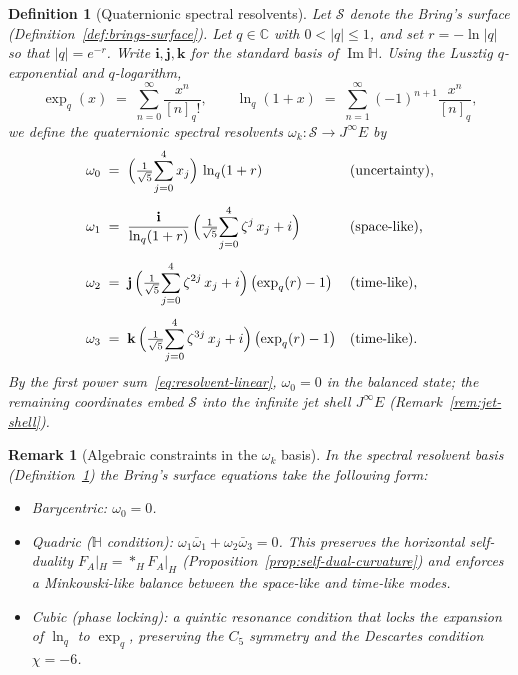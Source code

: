 \documentclass[12pt,a4paper]{report}
\newtheorem{definition}[theorem]{Definition}
\newtheorem{remark}[theorem]{Remark}
\begin{document}
\begin{definition}[Quaternionic spectral resolvents]
\label{def:quaternionic-spectral-resolvents}
Let $\mathcal{S}$ denote the Bring's surface
(Definition~\ref{def:brings-surface}).  Let $q\in\mathbb{C}$ with
$0<\lvert q\rvert\le 1$, and set $r=-\ln\lvert q\rvert$ so that
$\lvert q\rvert=e^{-r}$.
Write $\mathbf{i},\mathbf{j},\mathbf{k}$ for the standard basis of
$\operatorname{Im}\mathbb{H}$.
Using the Lusztig $q$-exponential and $q$-logarithm,
\begin{equation}\label{eq:q-exp}
  \exp_q(x)\;=\;\sum_{n=0}^{\infty}\frac{x^n}{[n]_q!},
  \qquad
  \ln_q(1+x)\;=\;\sum_{n=1}^{\infty}(-1)^{n+1}\frac{x^n}{[n]_q},
\end{equation}
we define the \emph{quaternionic spectral resolvents}
$\omega_k\colon\mathcal{S}\to J^\infty E$ by
\begin{align}
  \omega_0 &\;=\;
    \Bigl(\tfrac{1}{\sqrt{5}}\!\sum_{j=0}^{4}x_j\Bigr)\,
    \ln_q(1+r)
    &&\text{(uncertainty),}
    \label{eq:omega-0}\\[4pt]
  \omega_1 &\;=\;
    \frac{\mathbf{i}}{\ln_q(1+r)}\,
    \Bigl(\tfrac{1}{\sqrt{5}}\!\sum_{j=0}^{4}\zeta^{j}\,x_j+i\Bigr)
    &&\text{(space-like),}
    \label{eq:omega-1}\\[4pt]
  \omega_2 &\;=\;
    \mathbf{j}\,
    \Bigl(\tfrac{1}{\sqrt{5}}\!\sum_{j=0}^{4}\zeta^{2j}\,x_j+i\Bigr)\,
    \bigl(\exp_q(r)-1\bigr)
    &&\text{(time-like),}
    \label{eq:omega-2}\\[4pt]
  \omega_3 &\;=\;
    \mathbf{k}\,
    \Bigl(\tfrac{1}{\sqrt{5}}\!\sum_{j=0}^{4}\zeta^{3j}\,x_j+i\Bigr)\,
    \bigl(\exp_q(r)-1\bigr)
    &&\text{(time-like).}
    \label{eq:omega-3}
\end{align}
By the first power sum~\eqref{eq:resolvent-linear}, $\omega_0=0$ in the
balanced state; the remaining coordinates embed $\mathcal{S}$ into the
infinite jet shell $J^\infty E$
(Remark~\ref{rem:jet-shell}).
\end{definition}

\begin{remark}[Algebraic constraints in the $\omega_k$ basis]
\label{rem:omega-constraints}
In the spectral resolvent basis
(Definition~\ref{def:quaternionic-spectral-resolvents}) the
Bring's surface equations take the following form:
\begin{itemize}
\item \emph{Barycentric:}\; $\omega_0=0$.
\item \emph{Quadric ($\mathbb{H}$ condition):}\;
  $\omega_1\bar{\omega}_1+\omega_2\bar{\omega}_3=0$.
  This preserves the horizontal self-duality $F_A|_H={*_H}F_A|_H$
  (Proposition~\ref{prop:self-dual-curvature}) and enforces a
  Minkowski-like balance between the space-like and time-like modes.
\item \emph{Cubic (phase locking):}\; a quintic resonance condition that
  locks the expansion of $\ln_q$ to $\exp_q$, preserving the $C_5$
  symmetry and the Descartes condition $\chi=-6$.
\end{itemize}
\end{remark}
\end{document}
